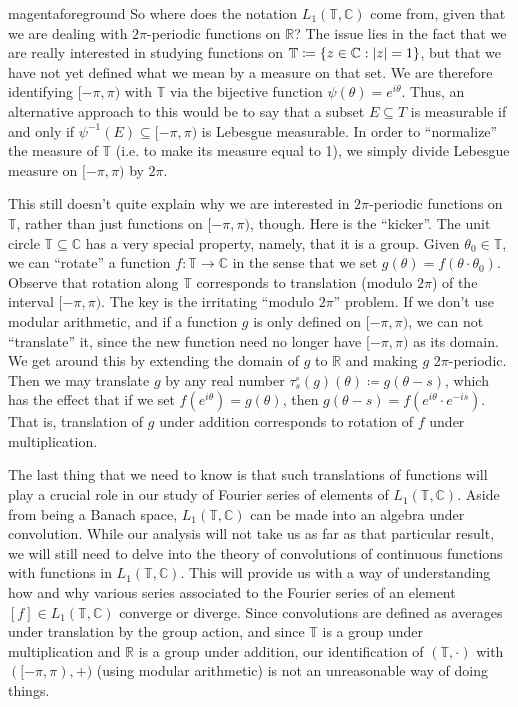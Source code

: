 \documentclass[notoc,notitlepage]{tufte-book}
\begin{document}
\begin{quotebox}{magenta}{foreground}
So where does the notation $L_1 (\mathbb{T}, \mathbb{C})$ come from,
given that we are dealing with $2 \pi$-periodic functions on $\mathbb{R}$?
The issue lies in the fact that we are really interested in studying functions
on $\mathbb{T} \coloneqq \{z \in \mathbb{C} : \left|z\right| = 1\}$,
but that we have not yet defined what we mean by a measure on that set.
We are therefore identifying $[-\pi, \pi)$ with $\mathbb{T}$ via
the bijective function $\psi(\theta) = e^{i \theta}$.
Thus, an alternative approach to this would be to say that
a subset $E \subseteq T$ is measurable if and only if
$\psi^{-1}(E) \subseteq [-\pi, \pi)$ is Lebesgue measurable.
In order to ``normalize'' the measure of $\mathbb{T}$
(i.e. to make its measure equal to 1),
we simply divide Lebesgue measure on $[-\pi, \pi)$ by $2 \pi$.

This still doesn't quite explain why we are interested in $2 \pi$-periodic functions
on $\mathbb{T}$, rather than just functions on $[-\pi, \pi)$, though.
Here is the ``kicker''.
The unit circle $\mathbb{T} \subseteq \mathbb{C}$ has a very special property,
namely, that it is a group.
Given $\theta_0 \in \mathbb{T}$, we can ``rotate'' a function
$f : \mathbb{T} \to \mathbb{C}$ in the sense that we set
$g(\theta) = f (\theta \cdot \theta_0 )$.
Observe that rotation along $\mathbb{T}$ corresponds to translation
(modulo $2 \pi$) of the interval $[-\pi, \pi)$.
The key is the irritating ``modulo $2 \pi$'' problem.
If we don't use modular arithmetic, and if a function $g$ is only defined
on $[-\pi, \pi)$, we can not ``translate'' it,
since the new function need no longer have $[-\pi, \pi)$ as its domain.
We get around this by extending the domain of $g$ to $\mathbb{R}$
and making $g$ $2 \pi$-periodic.
Then we may translate $g$ by any real number
$\tau_s^\circ(g)(\theta) \coloneqq g(\theta - s)$,
which has the effect that if we set $f (e^{i \theta}) = g(\theta)$,
then $g(\theta - s) = f (e^{i \theta} \cdot e^{-is})$.
That is, translation of $g$ under addition corresponds to
rotation of $f$ under multiplication.

The last thing that we need to know is that such translations of functions will
play a crucial role in our study
of Fourier series of elements of $L_1(\mathbb{T}, \mathbb{C})$.
Aside from being a Banach space, $L_1(\mathbb{T}, \mathbb{C})$ can be made
into an algebra under convolution.
While our analysis will not take us as far as that particular result,
we will still need to delve into the theory of convolutions of continuous functions
with functions in $L_1(\mathbb{T}, \mathbb{C})$.
This will provide us with a way of understanding how and why various series
associated to the Fourier series of an element $[f] \in L_1(\mathbb{T}, \mathbb{C})$
converge or diverge.
Since convolutions are defined as averages under translation by the group action,
and since $\mathbb{T}$ is a group under multiplication
and $\mathbb{R}$ is a group under addition,
our identification of $(\mathbb{T}, \cdot)$ with $([-\pi, \pi), +)$
(using modular arithmetic) is not an unreasonable way of doing things.
\end{quotebox}


\backmatter

\fancyhead[LE]{\thepage \enspace \textsl{\leftmark}}



\printindex
\end{document}
